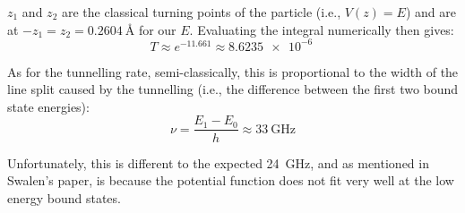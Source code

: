 \documentclass[a4paper]{scrartcl}
\begin{document}
\(z_1\) and \(z_2\) are the classical turning points of the particle (i.e., \(V(z) = E\)) and are at \(-z_1 = z_2 = \SI{0.2604}{\angstrom}\) for our \(E\). Evaluating the integral numerically then gives:
\[T \approx e^{-11.661} \approx \SI{8.6235e-6}{}\]

As for the tunnelling rate, semi-classically, this is proportional to the width of the line split caused by the tunnelling (i.e., the difference between the first two bound state energies):
\[\nu = \frac{E_1 - E_0}{h} \approx \SI{33}{\giga\hertz}\]

Unfortunately, this is different to the expected \SI{24}{\giga\hertz}, and as mentioned in Swalen's paper, is because the potential function does not fit very well at the low energy bound states.

\printbibliography
\end{document}
